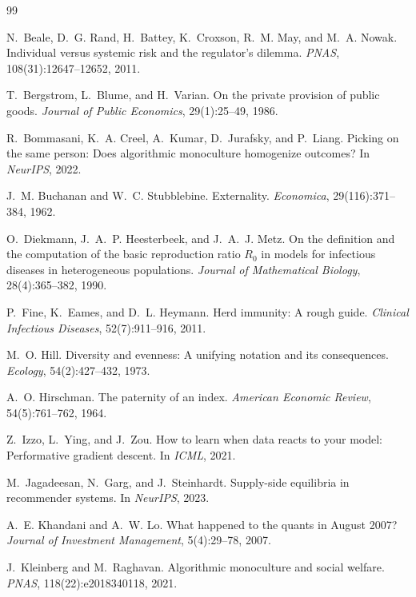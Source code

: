 \documentclass{article}
\theoremstyle{plain}
\theoremstyle{definition}
\begin{document}
\begin{thebibliography}{99}
\small

 N.~Beale, D.~G. Rand, H.~Battey, K.~Croxson, R.~M. May, and M.~A. Nowak. Individual versus systemic risk and the regulator's dilemma. \emph{PNAS}, 108(31):12647--12652, 2011.

 T.~Bergstrom, L.~Blume, and H.~Varian. On the private provision of public goods. \emph{Journal of Public Economics}, 29(1):25--49, 1986.

 R.~Bommasani, K.~A. Creel, A.~Kumar, D.~Jurafsky, and P.~Liang. Picking on the same person: Does algorithmic monoculture homogenize outcomes? In \emph{NeurIPS}, 2022.

 J.~M. Buchanan and W.~C. Stubblebine. Externality. \emph{Economica}, 29(116):371--384, 1962.

 O.~Diekmann, J.~A.~P. Heesterbeek, and J.~A.~J. Metz. On the definition and the computation of the basic reproduction ratio $R_0$ in models for infectious diseases in heterogeneous populations. \emph{Journal of Mathematical Biology}, 28(4):365--382, 1990.

 P.~Fine, K.~Eames, and D.~L. Heymann. Herd immunity: A rough guide. \emph{Clinical Infectious Diseases}, 52(7):911--916, 2011.

 M.~O. Hill. Diversity and evenness: A unifying notation and its consequences. \emph{Ecology}, 54(2):427--432, 1973.

 A.~O. Hirschman. The paternity of an index. \emph{American Economic Review}, 54(5):761--762, 1964.

 Z.~Izzo, L.~Ying, and J.~Zou. How to learn when data reacts to your model: Performative gradient descent. In \emph{ICML}, 2021.

 M.~Jagadeesan, N.~Garg, and J.~Steinhardt. Supply-side equilibria in recommender systems. In \emph{NeurIPS}, 2023.

 A.~E. Khandani and A.~W. Lo. What happened to the quants in August 2007? \emph{Journal of Investment Management}, 5(4):29--78, 2007.

 J.~Kleinberg and M.~Raghavan. Algorithmic monoculture and social welfare. \emph{PNAS}, 118(22):e2018340118, 2021.


\end{thebibliography}
\end{document}
